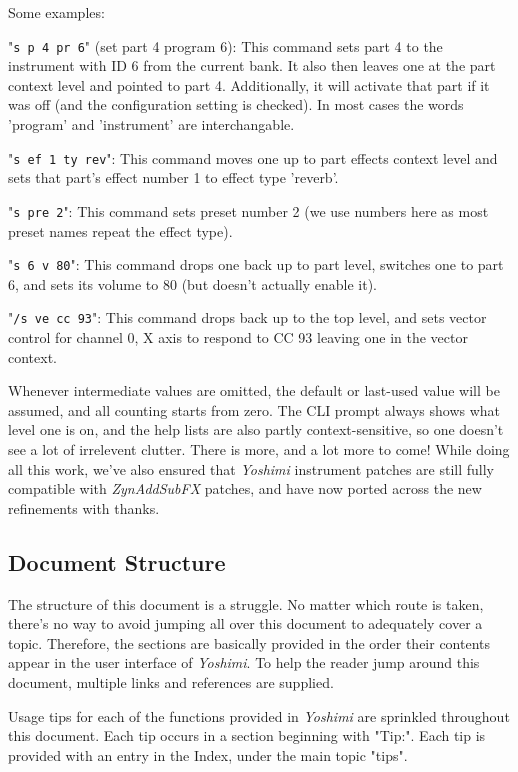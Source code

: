 \documentclass[
 11pt,
 twoside,
 a4paper,
 final                                 %
]{article}
\begin{document}
   Some examples:

   "\texttt{s p 4 pr 6}" (set part 4 program 6):
   This command sets part 4 to the instrument with ID 6 from the current bank.
   It also then leaves one at the part context level and pointed to part 4.
   Additionally, it will activate that part if it was off (and the
   configuration setting is checked). In most cases the words 'program' and
   'instrument' are interchangable.

   "\texttt{s ef 1 ty rev}":
   This command moves one up to part effects context level and sets that part's
   effect number 1 to effect type 'reverb'.

   "\texttt{s pre 2}":
   This command sets preset number 2 (we use numbers here as most preset names
   repeat the effect type).

   "\texttt{s 6 v 80}":
   This command drops one back up to part level, switches one to part 6, and
   sets its volume to 80 (but doesn't actually enable it).

   "\texttt{/s ve cc 93}":
   This command drops back up to the top level, and sets vector control for
   channel 0, X axis to respond to CC 93 leaving one in the vector context.

   Whenever intermediate values are omitted, the default or last-used value
   will be assumed, and all counting starts from zero.  The CLI prompt always
   shows what level one is on, and the help lists are also partly
   context-sensitive, so one doesn't see a lot of irrelevent clutter.  There is
   more, and a lot more to come!  While doing all this work, we've also ensured
   that \textsl{Yoshimi} instrument patches are still fully compatible with
   \textsl{ZynAddSubFX} patches, and have now ported across the new refinements
   with thanks.

\subsection{Document Structure}
\label{subsec:introduction_document_structure}

   The structure of this document is a struggle.  No matter which route is
   taken, there's no way to avoid jumping all over this document to
   adequately cover a topic.  Therefore, the sections are basically provided
   in the order their contents appear in the user interface of
   \textsl{Yoshimi}.  To help the reader jump around this document, multiple
   links and references are supplied.

   Usage tips
   for each of the functions provided in
   \textsl{Yoshimi} are sprinkled throughout this document.
   Each tip occurs in a section beginning with "Tip:".
   Each tip is provided with an entry in the Index, under the
   main topic "tips".
\end{document}
